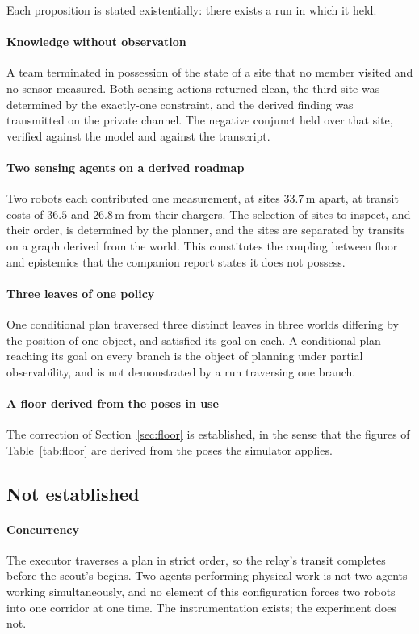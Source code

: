 \documentclass[11pt,a4paper]{article}
\theoremstyle{definition}
\begin{document}
Each proposition is stated existentially: there exists a run in which it held.

\paragraph{Knowledge without observation} A team terminated in possession of
the state of a site that no member visited and no sensor measured. Both sensing
actions returned clean, the third site was determined by the exactly-one
constraint, and the derived finding was transmitted on the private channel.
The negative conjunct held over that site, verified against the model and
against the transcript.

\paragraph{Two sensing agents on a derived roadmap} Two robots each contributed
one measurement, at sites $33.7$\,m apart, at transit costs of $36.5$ and
$26.8$\,m from their chargers. The selection of sites to inspect, and their
order, is determined by the planner, and the sites are separated by transits on
a graph derived from the world. This constitutes the coupling between floor and
epistemics that the companion report states it does not possess.

\paragraph{Three leaves of one policy} One conditional plan traversed three
distinct leaves in three worlds differing by the position of one object, and
satisfied its goal on each. A conditional plan reaching its goal on every
branch is the object of planning under partial observability, and is not
demonstrated by a run traversing one branch.

\paragraph{A floor derived from the poses in use} The correction of
Section~\ref{sec:floor} is established, in the sense that the figures of
Table~\ref{tab:floor} are derived from the poses the simulator applies.

\subsection{Not established}

\paragraph{Concurrency} The executor traverses a plan in strict order, so the
relay's transit completes before the scout's begins. Two agents performing
physical work is not two agents working simultaneously, and no element of this
configuration forces two robots into one corridor at one time. The
instrumentation exists; the experiment does not.
\end{document}
